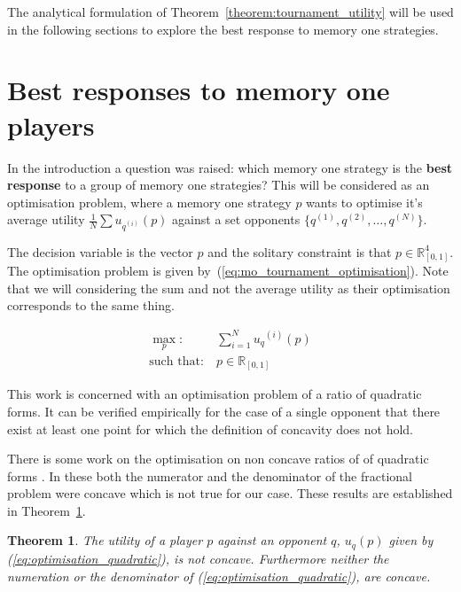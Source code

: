 \documentclass[10pt]{article}
\newcommand{\R}{\mathbb{R}}
\newtheorem{theorem}{Theorem}
\begin{document}
The analytical formulation of Theorem~\ref{theorem:tournament_utility} will be
used in the following sections to explore the best response to memory one
strategies.

\section{Best responses to memory one players}\label{section:best_response_mem_one}

In the introduction a question was raised: which memory one strategy is the \textbf{best response}
to a group of memory one strategies? This will be considered as an optimisation problem,
where a memory one strategy \(p\) wants to optimise it's average utility \( \frac{1}{N} \sum u_{q ^{(i)}} (p)\)
against a set opponents \(\{q^{(1)}, q^{(2)}, \dots, q^{(N)} \}\).

The decision variable is the vector \(p\) and the solitary constraint is that \(p \in \R^4_{[0, 1]} \).
The optimisation problem is given by~(\ref{eq:mo_tournament_optimisation}). Note that
we will considering the sum and not the average utility as their optimisation corresponds
to the same thing.

\begin{equation}\label{eq:mo_tournament_optimisation}
    \begin{aligned}
    \max_p: & \ \sum_{i=1} ^ {N} {u_q}^{(i)} (p)
    \\
    \text{such that}: & \ p \in \R_{[0, 1]}
    \end{aligned}
\end{equation}

This work is concerned with an optimisation problem of a ratio of quadratic forms.
It can be verified empirically for the case of a single opponent that there exist at
least one point for which the definition of concavity does not hold.

There is some work on the optimisation on non concave ratios of of quadratic forms
\cite{Beck2009, Hongyan2014}. In these both the numerator and the denominator
of the fractional problem were concave which is not true for our case.
These results are established in Theorem~\ref{theorem:concavity}.

\begin{theorem}\label{theorem:concavity}
    The utility of a player \(p\) against an opponent \(q\), \(u_q (p)\) given by
    (\ref{eq:optimisation_quadratic}), is not concave. Furthermore neither the
    numeration or the denominator of (\ref{eq:optimisation_quadratic}), are concave.
\end{theorem}
\end{document}
